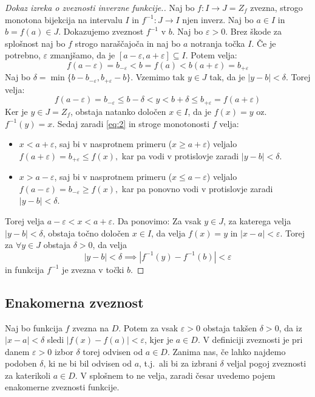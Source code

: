\documentclass[10pt, a4paper]{article}
\newenvironment{noticeC}{%
  \tcolorbox[%
  notitle,
  empty,
  enhanced,  %
  breakable,
  coltext=black, 
  fontupper=\rmfamily,
  noparskip,
  sharp corners,
  boxrule=-1pt,  %
  frame hidden,
  left=7pt,  %
  right=7pt,
  top=5pt,
  bottom=5pt,
  before skip=2.5ex plus 2pt,
  after skip=2.5ex plus 2pt,
  overlay unbroken and last={%
  },
  ]}
{\endtcolorbox}
\newenvironment{dokaz}%
  {\begin{noticeC}\begin{proof}}%
  {\end{proof}\end{noticeC}}
\begin{document}
\begin{dokaz}[Dokaz izreka o zveznosti inverzne funkcije.]
    Naj bo $f: I \rightarrow J = Z_f$ zvezna, strogo monotona bijekcija na intervalu $I$ in 
    $f^{-1} : J \rightarrow I$ njen inverz. Naj bo $a \in I$ in $b = f(a) \in J$. Dokazujemo zveznost $f^{-1}$ v $b$.
    Naj bo $\varepsilon>0$. Brez škode za splošnost naj bo $f$ strogo naraščajoča in naj bo $a$ notranja točka $I$. Če je potrebno, $\varepsilon$
    zmanjšamo, da je $[a - \varepsilon, a+ \varepsilon] \subseteq I.$ Potem velja:
    $$f(a-\varepsilon) = b_{-\varepsilon} < b = f(a) < b(a+\varepsilon) = b_{+\varepsilon}$$
    Naj bo $\delta = \min\{b-b_{-\varepsilon}, b_{+\varepsilon}-b\}$. Vzemimo tak $y \in J$ tak, da je $|y-b| < \delta.$ Torej velja:
    \begin{equation}
        \label{eq:2} \tag{$*$} f(a-\varepsilon) = b_{-\varepsilon} \leq b-\delta < y < b + \delta \leq b_{+\varepsilon} = f(a+\varepsilon)
    \end{equation}
    Ker je $y \in J = Z_f$, obstaja natanko določen $x \in I$, da je $f(x) = y$ oz. $f^{-1} (y) = x.$ 
    Sedaj zaradi \eqref{eq:2} in stroge monotonosti $f$ velja:
    \begin{itemize}
        \item $x< a+\varepsilon$, saj bi v nasprotnem primeru ($x \geq a + \varepsilon$) veljalo $f(a+\varepsilon) = b_{+\varepsilon} \leq f(x),$ kar pa vodi v protislovje zaradi $|y-b|<\delta.$
        \item $x > a-\varepsilon$, saj bi v nasprotnem primeru ($x \leq a - \varepsilon$) veljalo $f(a-\varepsilon) = b_{-\varepsilon} \geq f(x),$ kar pa ponovno vodi v protislovje zaradi $|y-b|<\delta.$
    \end{itemize}
    Torej velja $a-\varepsilon < x < a+\varepsilon$.
    Da ponovimo: Za vsak $y \in J$, za katerega velja $|y-b| < \delta$, obstaja točno določen $x \in I$, da velja
    $f(x) = y$ in $|x-a| < \varepsilon.$ Torej za $\forall y \in J$ obstaja $\delta>0$, da velja
    $$|y-b| < \delta \implies |f^{-1} (y) - f^{-1} (b)| < \varepsilon$$ in funkcija $f^{-1}$ je zvezna v točki $b$.
\end{dokaz}

\subsection{Enakomerna zveznost}

Naj bo funkcija $f$ zvezna na $D$. 
Potem za vsak $\varepsilon > 0$ obstaja takšen $\delta>0$, da iz $|x-a| < \delta$ sledi $|f(x)-f(a)| < \varepsilon$, kjer je $a \in D$. 
V definiciji zveznosti je pri danem $\varepsilon>0$ izbor $\delta$ torej odvisen od $a \in D$. 
Zanima nas, če lahko najdemo podoben $\delta$, ki ne bi bil odvisen od $a$, t.j.~ali bi za izbrani $\delta$ veljal pogoj zveznosti za katerikoli $a \in D$.
V splošnem to ne velja, zaradi česar uvedemo pojem enakomerne zveznosti funkcije.
\end{document}
